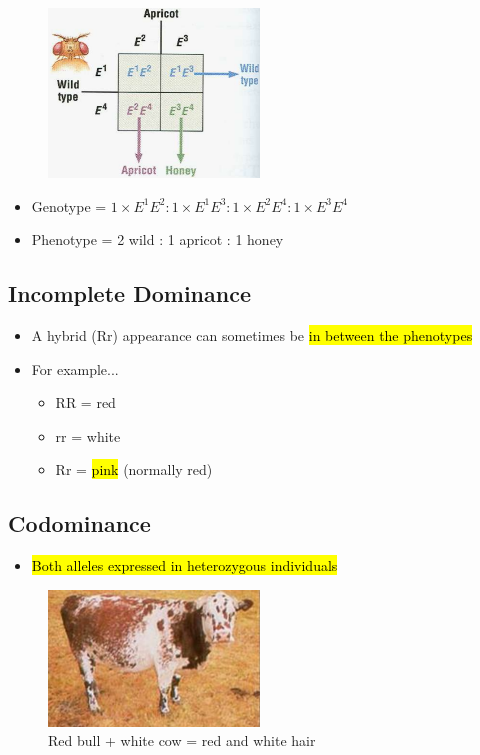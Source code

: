\documentclass[a4paper,12pt]{article}
\begin{document}
\begin{figure}[H]
    \centering
    \includegraphics[width=0.50\textwidth]{ex1b}
\end{figure}

\begin{itemize}
    \item{Genotype = $1 \times E^1E^2 : 1 \times E^1E^3 : 1 \times E^2E^4 : 1 \times E^3E^4$}
    \item{Phenotype = 2 wild : 1 apricot : 1 honey}
\end{itemize}

\subsection{Incomplete Dominance}
\begin{itemize}
    \item{A hybrid (Rr) appearance can sometimes be \hl{in between the phenotypes}}
    \item{
            For example...
            \begin{itemize}
                \item{RR = red}
                \item{rr = white}
                \item{Rr = \hl{pink} (normally red)}
            \end{itemize}
        }
\end{itemize}

\subsection{Codominance}
\begin{itemize}
    \item{\hl{Both alleles expressed in heterozygous individuals}}
\end{itemize}

\begin{figure}[H]
    \centering
    \includegraphics[width=0.50\textwidth]{codom}
    \caption{Red bull + white cow = red and white hair}
\end{figure}
\end{document}
